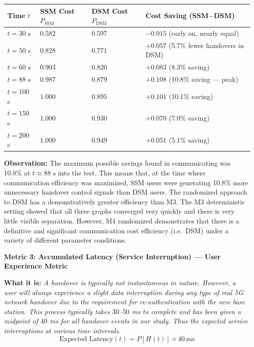 \documentclass[11pt]{article}
\newcommand{\subquestion}[1]{
    \vspace{0.3cm}
    \noindent\textbf{#1}
    \vspace{0.1cm}
}
\newcommand{\highlight}[1]{\textit{#1}}
\begin{document}
\begin{enumerate}[label=\textbf{Scribe Question \arabic*:}, leftmargin=*, itemsep=1.5em]
\vspace{0.3cm}
\begin{center}
\begin{tabular}{llll}
    \toprule
    \textbf{Time $t$} & \textbf{SSM Cost $P_{\text{SSM}}$} & \textbf{DSM Cost $P_{\text{DSM}}$} & \textbf{Cost Saving (SSM$-$DSM)} \\
    \midrule
    $t = 30$ s  & $0.582$ & $0.597$ & $-0.015$ (early on, nearly equal) \\
    $t = 50$ s  & $0.828$ & $0.771$ & $+0.057$ (5.7\% fewer handovers in DSM) \\
    $t = 60$ s  & $0.903$ & $0.820$ & $+0.083$ (8.3\% saving) \\
    $t = 88$ s  & $0.987$ & $0.879$ & $+0.108$ (10.8\% saving --- peak) \\
    $t = 100$ s & $1.000$ & $0.895$ & $+0.101$ (10.1\% saving) \\
    $t = 150$ s & $1.000$ & $0.930$ & $+0.070$ (7.0\% saving) \\
    $t = 200$ s & $1.000$ & $0.949$ & $+0.051$ (5.1\% saving) \\
    \bottomrule
\end{tabular}
\end{center}
\vspace{0.3cm}

\textbf{Observation:} The maximum possible savings found in communicating was 10.8\% at
$t \approx 88$ s into the test. This means that, at the time where communication efficiency was
maximized, SSM users were generating 10.8\% more unnecessary handover control signals than DSM
users. The randomized approach to DSM has a demonstratively greater efficiency than M3. The M3
deterministic setting showed that all three graphs converged very quickly and there is very little
visible separation. However, M4 randomized demonstrates that there is a definitive and significant
communication cost efficiency (i.e.\ DSM) under a variety of different parameter conditions.

\subquestion{Metric 3: Accumulated Latency (Service Interruption) --- User Experience Metric}

\textbf{What it is:} \highlight{A handover is typically not instantaneous in nature. However, a user
will always experience a slight data interruption during any type of real 5G network handover due to
the requirement for re-authentication with the new base station. This process typically takes
$30$--$50$ ms to complete and has been given a midpoint of $40$ ms for all handover events in our
study. Thus the expected service interruptions at various time intervals.}
\[
\text{Expected Latency}(t) = P[H(t)] \times 40\ \text{ms}
\]


\end{enumerate}
\end{document}
